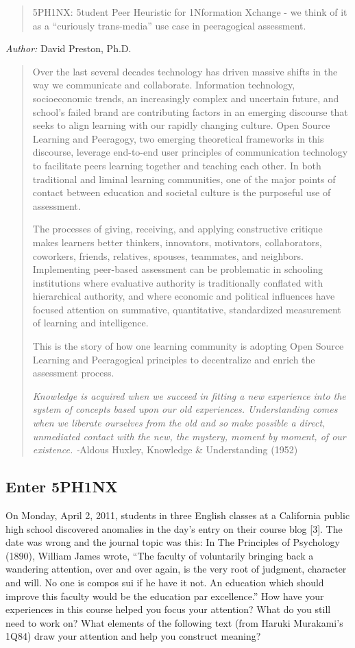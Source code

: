 \begin{quote}
5PH1NX: 5tudent Peer Heuristic for 1Nformation Xchange - we think of it
as a ``curiously trans-media'' use case in peeragogical assessment.
\end{quote}
\emph{Author:} David Preston, Ph.D.

\begin{quote}
Over the last several decades technology has driven massive shifts in
the way we communicate and collaborate. Information technology,
socioeconomic trends, an increasingly complex and uncertain future, and
school's failed brand are contributing factors in an emerging discourse
that seeks to align learning with our rapidly changing culture. Open
Source Learning and Peeragogy, two emerging theoretical frameworks in
this discourse, leverage end-to-end user principles of communication
technology to facilitate peers learning together and teaching each
other. In both traditional and liminal learning communities, one of the
major points of contact between education and societal culture is the
purposeful use of assessment.

The processes of giving, receiving, and applying constructive critique
makes learners better thinkers, innovators, motivators, collaborators,
coworkers, friends, relatives, spouses, teammates, and neighbors.
Implementing peer-based assessment can be problematic in schooling
institutions where evaluative authority is traditionally conflated with
hierarchical authority, and where economic and political influences have
focused attention on summative, quantitative, standardized measurement
of learning and intelligence.

This is the story of how one learning community is adopting Open Source
Learning and Peeragogical principles to decentralize and enrich the
assessment process.

\emph{Knowledge is acquired when we succeed in fitting a new experience
into the system of concepts based upon our old experiences.
Understanding comes when we liberate ourselves from the old and so make
possible a direct, unmediated contact with the new, the mystery, moment
by moment, of our existence. -}Aldous Huxley, Knowledge \& Understanding
(1952)

\end{quote}
\subsection{Enter 5PH1NX}

On Monday, April 2, 2011, students in three English classes at a
California public high school discovered anomalies in the day's entry on
their course blog {[}3{]}. The date was wrong and the journal topic was
this: In The Principles of Psychology (1890), William James wrote, ``The
faculty of voluntarily bringing back a wandering attention, over and
over again, is the very root of judgment, character and will. No one is
compos sui if he have it not. An education which should improve this
faculty would be the education par excellence.'' How have your
experiences in this course helped you focus your attention? What do you
still need to work on? What elements of the following text (from Haruki
Murakami's 1Q84) draw your attention and help you construct meaning? 

